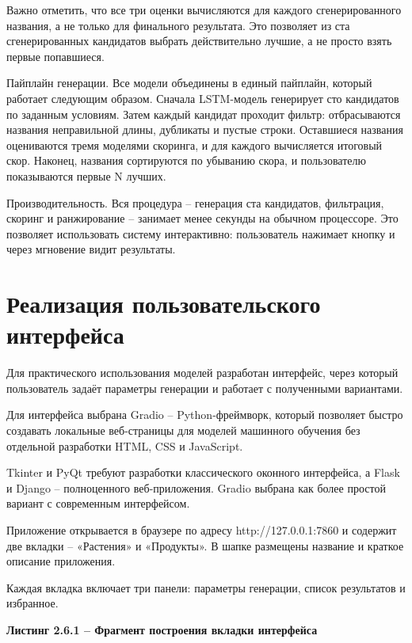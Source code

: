 Важно отметить, что все три оценки вычисляются для каждого сгенерированного названия, а не только для финального результата. Это позволяет из ста сгенерированных кандидатов выбрать действительно лучшие, а не просто взять первые попавшиеся.

Пайплайн генерации. Все модели объединены в единый пайплайн, который работает следующим образом. Сначала LSTM-модель генерирует сто кандидатов по заданным условиям. Затем каждый кандидат проходит фильтр: отбрасываются названия неправильной длины, дубликаты и пустые строки. Оставшиеся названия оцениваются тремя моделями скоринга, и для каждого вычисляется итоговый скор. Наконец, названия сортируются по убыванию скора, и пользователю показываются первые N лучших.

Производительность. Вся процедура -- генерация ста кандидатов, фильтрация, скоринг и ранжирование -- занимает менее секунды на обычном процессоре. Это позволяет использовать систему интерактивно: пользователь нажимает кнопку и через мгновение видит результаты.

\section{Реализация пользовательского интерфейса}\label{ux440ux435ux430ux43bux438ux437ux430ux446ux438ux44f-ux43fux43eux43bux44cux437ux43eux432ux430ux442ux435ux43bux44cux441ux43aux43eux433ux43e-ux438ux43dux442ux435ux440ux444ux435ux439ux441ux430}

Для практического использования моделей разработан интерфейс, через который пользователь задаёт параметры генерации и работает с полученными вариантами.

Для интерфейса выбрана Gradio -- Python-фреймворк, который позволяет быстро создавать локальные веб-страницы для моделей машинного обучения без отдельной разработки HTML, CSS и JavaScript.

Tkinter и PyQt требуют разработки классического оконного интерфейса, а Flask и Django -- полноценного веб-приложения. Gradio выбрана как более простой вариант с современным интерфейсом.

Приложение открывается в браузере по адресу http://127.0.0.1:7860 и содержит две вкладки -- «Растения» и «Продукты». В шапке размещены название и краткое описание приложения.

Каждая вкладка включает три панели: параметры генерации, список результатов и избранное.

\textbf{Листинг 2.6.1 -- Фрагмент построения вкладки интерфейса}

